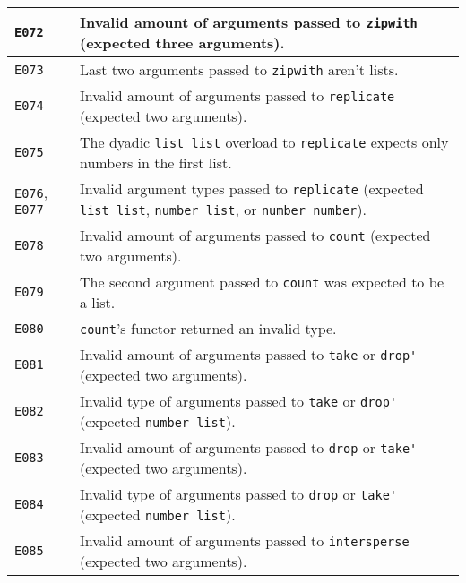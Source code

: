\begin{longtable}{ | p{6em} | p{34em} | }
\verb|E072|          & Invalid amount of arguments passed to \verb|zipwith| (expected three arguments).                                                               \\ \hline
\verb|E073|          & Last two arguments passed to \verb|zipwith| aren't lists.                                                                                      \\ \hline
\verb|E074|          & Invalid amount of arguments passed to \verb|replicate| (expected two arguments).                                                               \\ \hline
\verb|E075|          & The dyadic \verb|list list| overload to \verb|replicate| expects only numbers in the first list.                                               \\ \hline
\verb|E076|, \verb|E077| & Invalid argument types passed to \verb|replicate| (expected \verb|list list|, \verb|number list|, or \verb|number number|).                 \\ \hline
\verb|E078|          & Invalid amount of arguments passed to \verb|count| (expected two arguments).                                                                   \\ \hline
\verb|E079|          & The second argument passed to \verb|count| was expected to be a list.                                                                          \\ \hline
\verb|E080|          & \verb|count|'s functor returned an invalid type.                                                                                               \\ \hline
\verb|E081|          & Invalid amount of arguments passed to \verb|take| or \verb|drop'| (expected two arguments).                                                    \\ \hline
\verb|E082|          & Invalid type of arguments passed to \verb|take| or \verb|drop'| (expected \verb|number list|).                                                 \\ \hline
\verb|E083|          & Invalid amount of arguments passed to \verb|drop| or \verb|take'| (expected two arguments).                                                    \\ \hline
\verb|E084|          & Invalid type of arguments passed to \verb|drop| or \verb|take'| (expected \verb|number list|).                                                 \\ \hline
\verb|E085|          & Invalid amount of arguments passed to \verb|intersperse| (expected two arguments).                                                             \\ \hline

\end{longtable}
